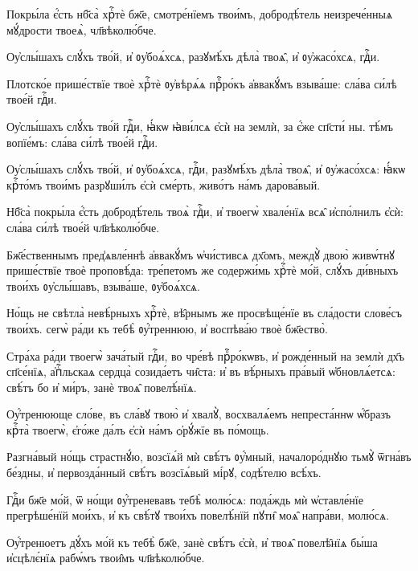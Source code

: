 \hKv Покры́ла є҆́сть нб҃са̀ хрⷭ҇тѐ бж҃е, смотре́нїемъ твои́мъ,  добродѣ́тель неизрече́нныѧ мꙋ́дрости твоеѧ̀,  чл҃вѣколю́бче. 

\hKv Оу҆слы́шахъ слꙋ́хъ тво́й, и҆ ᲂу҆боѧ́хсѧ, разꙋмѣ́хъ дѣла̀  твоѧ̑, и҆ ᲂу҆жасо́хсѧ, гдⷭ҇и. 

\hKv Плотско́е прише́ствїе твоѐ хрⷭ҇тѐ ᲂу҆вѣрѧ́ѧ прⷪ҇ро́къ  а҆ввакꙋ́мъ взыва́ше: сла́ва си́лѣ твое́й гдⷭ҇и. 

\hKv Оу҆слы́шахъ слꙋ́хъ тво́й гдⷭ҇и, ꙗ҆́кѡ ꙗ҆ви́лсѧ є҆сѝ на  землѝ, за є҆́же сп҃сти́ ны. тѣ́мъ вопїе́мъ: сла́ва си́лѣ  твое́й гдⷭ҇и. 

\hKv Оу҆слы́шахъ слꙋ́хъ тво́й, и҆ ᲂу҆боѧ́хсѧ, гдⷭ҇и, разꙋмѣ́хъ  дѣла̀ твоѧ̑, и҆ ᲂу҆жасо́хсѧ: ꙗ҆́кѡ  крⷭ҇то́мъ твои́мъ разрꙋши́лъ є҆сѝ сме́рть, живо́тъ  на́мъ дарова́вый. 

\hKv Нб҃са̀ покры́ла є҆́сть добродѣ́тель твоѧ̀ гдⷭ҇и, и҆  твоегѡ̀ хвале́нїѧ всѧ̑ и҆спо́лнилъ є҆сѝ: сла́ва си́лѣ  твое́й чл҃вѣколю́бче. 

\hKv Бж҃е́ственнымъ пред̾ѧвле́ннѣ а҆ввакꙋ́мъ ѡ҆чи́стивсѧ  дх҃омъ, междꙋ̀ двою̀ живѡ́тнꙋ прише́ствїе твоѐ проповѣ́да:  тре́петомъ же содержи́мь хрⷭ҇тѐ мо́й, слꙋ́хъ ди́вныхъ  твои́хъ ᲂу҆слы́шавъ, взыва́ше, ᲂу҆боѧ́хсѧ. 
%

\hKv Но́щь не свѣтла̀ невѣ́рныхъ хрⷭ҇тѐ, вѣ̑рнымъ же  просвѣще́нїе въ сла́дости слове́съ твои́хъ. сегѡ̀ ра́ди къ  тебѣ̀ ᲂу҆́треннюю, и҆ воспѣва́ю твоѐ бж҃ество̀. 
%

\hKv Стра́ха ра́ди твоегѡ̀ зача́тый гдⷭ҇и, во  чре́вѣ прⷪ҇ро́кѡвъ, и҆ рожде́нный на землѝ дх҃ъ сп҃се́нїѧ,  а҆пⷭ҇льскаѧ сердца̀  созида́етъ  чи̑ста: и҆ въ вѣ́рныхъ пра́вый ѡ҆бновлѧ́етсѧ: свѣ́тъ бо и҆  ми́ръ, занѐ твоѧ̑ повелѣ́нїѧ. 
%

\hKv Оу҆́тренююще сло́ве, въ сла́вꙋ твою̀ и҆ хвалꙋ̀,  восхвалѧ́емъ непреста́ннѡ ѡ҆́бразъ крⷭ҇та̀ твоегѡ̀, є҆го́же  да́лъ є҆сѝ на́мъ ѻ҆рꙋ́жїе въ по́мощь. 

\hKv Разгна́вый но́щь страстнꙋ́ю, возсїѧ́й мѝ свѣ́тъ ᲂу҆́мный,  началоро́днꙋю тьмꙋ̀ ѿгна́въ бе́здны, и҆ первозда́нный  свѣ́тъ возсїѧ́вый мі́рꙋ, содѣ́телю всѣ́хъ. 

\hKv Гдⷭ҇и бж҃е мо́й, ѿ но́щи ᲂу҆́треневавъ тебѣ̀ молю́сѧ:  пода́ждь мѝ ѡ҆ставле́нїе прегрѣше́нїй мои́хъ, и҆ къ  свѣ́тꙋ твои́хъ повелѣ́нїй пꙋти̑ моѧ̑ напра́ви, молю́сѧ. 

\hKv Оу҆́тренюетъ дꙋ́хъ мо́й къ тебѣ̀ бж҃е, занѐ свѣ́тъ  є҆сѝ, и҆ твоѧ̑ повелѣ̑нїѧ бы́ша и҆сцѣлє́нїѧ рабѡ́мъ  твои̑мъ чл҃вѣколю́бче. 

